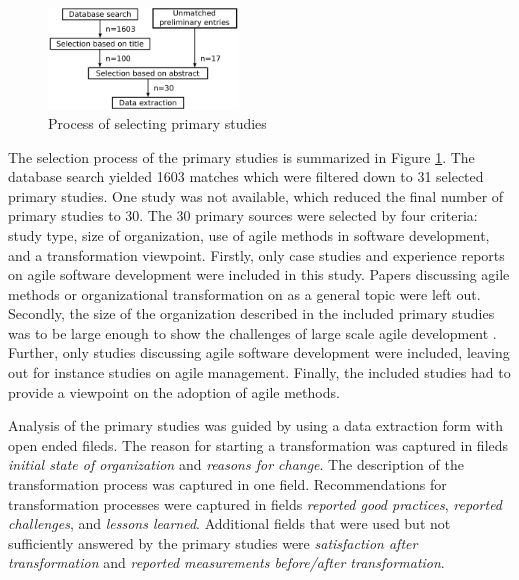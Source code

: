 \documentclass[lnbip]{svmultln}
\begin{document}
\begin{figure}[b]
  \begin{center}
    \includegraphics[width=0.45\textwidth]{researchprocess}
    \caption{Process of selecting primary studies}
    \label{fig:selection_process}
  \end{center}
\end{figure}

The selection process of the primary studies is summarized in Figure
\ref{fig:selection_process}. The database search yielded 1603 matches which were
filtered down to 31 selected primary studies. One study was not available, which
reduced the final number of primary studies to 30.
The 30 primary sources were selected by four criteria: study type, size of
organization, use of agile methods in software development, and a transformation
viewpoint. Firstly, only case studies and experience reports on agile software
development were included in this study. Papers discussing agile methods or
organizational transformation on as a general topic were left out. Secondly, the
size of the organization described in the included primary studies was to be
large enough to show the challenges of large scale agile development
. Further, only studies discussing agile software
development were included, leaving out for instance studies on agile management.
Finally, the included studies had to provide a viewpoint on the adoption of
agile methods.


Analysis of the primary studies was guided by using a data extraction form with
open ended fileds. The reason for starting a transformation was captured in
fileds \textit{initial state of organization} and \textit{reasons for change}.
The description of the transformation process was captured in one field.
Recommendations for transformation processes were captured in fields
\textit{reported good practices}, \textit{reported challenges}, and
\textit{lessons learned}.
Additional fields that were used but not sufficiently answered by the primary
studies were \textit{satisfaction after transformation} and \textit{reported
measurements before/after transformation}.
\end{document}

